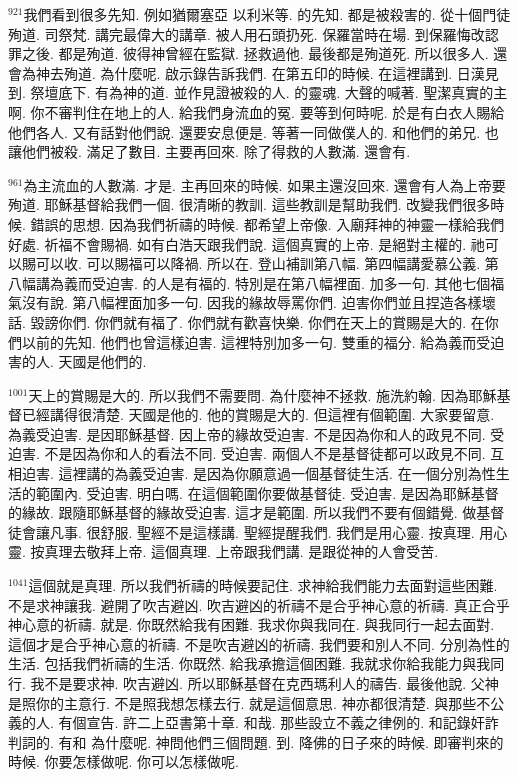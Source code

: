 \documentclass{book}
\begin{document}
$^{921}$我們看到很多先知.
例如猶爾塞亞 以利米等.
的先知.
都是被殺害的.
從十個門徒殉道.
司祭梵.
講完最偉大的講章.
被人用石頭扔死.
保羅當時在場.
到保羅悔改認罪之後.
都是殉道.
彼得神曾經在監獄.
拯救過他.
最後都是殉道死.
所以很多人.
還會為神去殉道.
為什麼呢.
啟示錄告訴我們.
在第五印的時候.
在這裡講到.
日漢見到.
祭壇底下.
有為神的道.
並作見證被殺的人.
的靈魂.
大聲的喊著.
聖潔真實的主啊.
你不審判住在地上的人.
給我們身流血的冤.
要等到何時呢.
於是有白衣人賜給他們各人.
又有話對他們說.
還要安息便是.
等著一同做僕人的.
和他們的弟兄.
也讓他們被殺.
滿足了數目.
主要再回來.
除了得救的人數滿.
還會有.

$^{961}$為主流血的人數滿.
才是.
主再回來的時候.
如果主還沒回來.
還會有人為上帝要殉道.
耶穌基督給我們一個.
很清晰的教訓.
這些教訓是幫助我們.
改變我們很多時候.
錯誤的思想.
因為我們祈禱的時候.
都希望上帝像.
入廟拜神的神靈一樣給我們好處.
祈福不會賜禍.
如有白浩天跟我們說.
這個真實的上帝.
是絕對主權的.
祂可以賜可以收.
可以賜福可以降禍.
所以在.
登山補訓第八幅.
第四幅講愛慕公義.
第八幅講為義而受迫害.
的人是有福的.
特別是在第八幅裡面.
加多一句.
其他七個福氣沒有說.
第八幅裡面加多一句.
因我的緣故辱罵你們.
迫害你們並且捏造各樣壞話.
毀謗你們.
你們就有福了.
你們就有歡喜快樂.
你們在天上的賞賜是大的.
在你們以前的先知.
他們也曾這樣迫害.
這裡特別加多一句.
雙重的福分.
給為義而受迫害的人.
天國是他們的.

$^{1001}$天上的賞賜是大的.
所以我們不需要問.
為什麼神不拯救.
施洗約翰.
因為耶穌基督已經講得很清楚.
天國是他的.
他的賞賜是大的.
但這裡有個範圍.
大家要留意.
為義受迫害.
是因耶穌基督.
因上帝的緣故受迫害.
不是因為你和人的政見不同.
受迫害.
不是因為你和人的看法不同.
受迫害.
兩個人不是基督徒都可以政見不同.
互相迫害.
這裡講的為義受迫害.
是因為你願意過一個基督徒生活.
在一個分別為性生活的範圍內.
受迫害.
明白嗎.
在這個範圍你要做基督徒.
受迫害.
是因為耶穌基督的緣故.
跟隨耶穌基督的緣故受迫害.
這才是範圍.
所以我們不要有個錯覺.
做基督徒會讓凡事.
很舒服.
聖經不是這樣講.
聖經提醒我們.
我們是用心靈.
按真理.
用心靈.
按真理去敬拜上帝.
這個真理.
上帝跟我們講.
是跟從神的人會受苦.

$^{1041}$這個就是真理.
所以我們祈禱的時候要記住.
求神給我們能力去面對這些困難.
不是求神讓我.
避開了吹吉避凶.
吹吉避凶的祈禱不是合乎神心意的祈禱.
真正合乎神心意的祈禱.
就是.
你既然給我有困難.
我求你與我同在.
與我同行一起去面對.
這個才是合乎神心意的祈禱.
不是吹吉避凶的祈禱.
我們要和別人不同.
分別為性的生活.
包括我們祈禱的生活.
你既然.
給我承擔這個困難.
我就求你給我能力與我同行.
我不是要求神.
吹吉避凶.
所以耶穌基督在克西瑪利人的禱告.
最後他說.
父神是照你的主意行.
不是照我想怎樣去行.
就是這個意思.
神亦都很清楚.
與那些不公義的人.
有個宣告.
許二上亞書第十章.
和哉.
那些設立不義之律例的.
和記錄奸詐判詞的.
有和 為什麼呢.
神問他們三個問題.
到.
降佛的日子來的時候.
即審判來的時候.
你要怎樣做呢.
你可以怎樣做呢.
\end{document}
